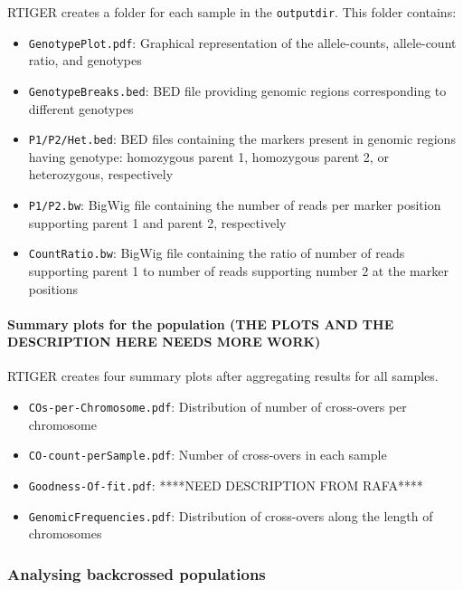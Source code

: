 \documentclass[]{article}
\providecommand{\tightlist}{%
  \setlength{\itemsep}{0pt}\setlength{\parskip}{0pt}}
\let\oldparagraph\paragraph
\renewcommand{\paragraph}[1]{\oldparagraph{#1}\mbox{}}
\begin{document}
RTIGER creates a folder for each sample in the \texttt{outputdir}. This
folder contains:

\begin{itemize}
\tightlist
\item
  \texttt{GenotypePlot.pdf}: Graphical representation of the
  allele-counts, allele-count ratio, and genotypes
\item
  \texttt{GenotypeBreaks.bed}: BED file providing genomic regions
  corresponding to different genotypes
\item
  \texttt{P1/P2/Het.bed}: BED files containing the markers present in
  genomic regions having genotype: homozygous parent 1, homozygous
  parent 2, or heterozygous, respectively
\item
  \texttt{P1/P2.bw}: BigWig file containing the number of reads per
  marker position supporting parent 1 and parent 2, respectively
\item
  \texttt{CountRatio.bw}: BigWig file containing the ratio of number of
  reads supporting parent 1 to number of reads supporting number 2 at
  the marker positions
\end{itemize}

\hypertarget{summary-plots-for-the-population-the-plots-and-the-description-here-needs-more-work}{%
\paragraph{Summary plots for the population (THE PLOTS AND THE
DESCRIPTION HERE NEEDS MORE
WORK)}\label{summary-plots-for-the-population-the-plots-and-the-description-here-needs-more-work}}

RTIGER creates four summary plots after aggregating results for all
samples.

\begin{itemize}
\tightlist
\item
  \texttt{COs-per-Chromosome.pdf}: Distribution of number of cross-overs
  per chromosome
\item
  \texttt{CO-count-perSample.pdf}: Number of cross-overs in each sample
\item
  \texttt{Goodness-Of-fit.pdf}: ****NEED DESCRIPTION FROM RAFA****
\item
  \texttt{GenomicFrequencies.pdf}: Distribution of cross-overs along the
  length of chromosomes
\end{itemize}

\hypertarget{analysing-backcrossed-populations}{%
\subsubsection{Analysing backcrossed
populations}\label{analysing-backcrossed-populations}}
\end{document}
